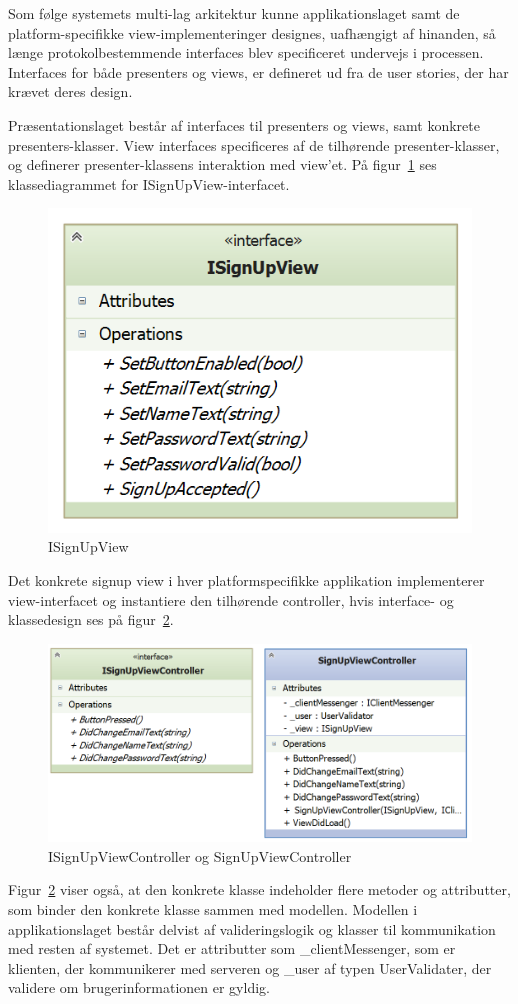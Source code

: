 Som følge systemets multi-lag arkitektur kunne applikationslaget samt de platform-specifikke view-implementeringer
designes, uafhængigt af hinanden, så længe protokolbestemmende interfaces blev specificeret undervejs i processen. Interfaces for både presenters og views, er defineret ud fra de user stories, der har krævet deres design.

Præsentationslaget består af interfaces til presenters og views, samt konkrete presenters-klasser. View interfaces specificeres af de tilhørende presenter-klasser, og definerer presenter-klassens interaktion med view'et. På figur~\ref{fig:application_isignupview} ses klassediagrammet for ISignUpView-interfacet.

\begin{figure}
\centering
\includegraphics[width=0.35\linewidth]{figs/design/application_isignupview}
\caption{ISignUpView}
\label{fig:application_isignupview}
\end{figure}

Det konkrete signup view i hver platformspecifikke applikation implementerer view-interfacet og instantiere den tilhørende controller, hvis interface- og klassedesign ses på figur~\ref{fig:application_isignupviewcontroller}.

\begin{figure}
\centering
\includegraphics[width=0.7\linewidth]{figs/design/application_signupviewcontrollerandinterface}
\caption{ISignUpViewController og SignUpViewController}
\label{fig:application_isignupviewcontroller}
\end{figure}
Figur~\ref{fig:application_isignupviewcontroller} viser også, at den konkrete klasse indeholder flere metoder og attributter, som binder den konkrete klasse sammen med modellen. Modellen i applikationslaget består delvist af valideringslogik og klasser til kommunikation med resten af systemet. Det er attributter som \_clientMessenger, som er klienten, der kommunikerer med serveren og \_user af typen UserValidater, der validere om brugerinformationen er gyldig.

